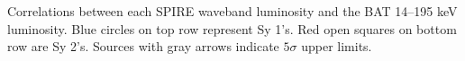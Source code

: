 Correlations between each SPIRE waveband luminosity and the BAT 14--195 keV luminosity. Blue circles on top row represent Sy 1's. Red open squares on bottom row are Sy 2's. Sources with gray arrows indicate $5\sigma$ upper limits.\label{fig:lum_spire_BAT}